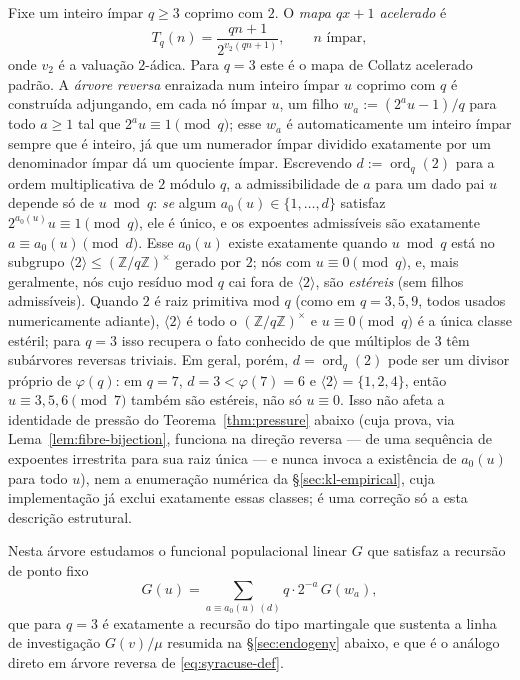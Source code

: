 \documentclass[11pt]{article}
\theoremstyle{definition}
\theoremstyle{remark}
\DeclareMathOperator{\OpOrd}{ord}
\begin{document}
Fixe um inteiro ímpar $q\ge 3$ coprimo com $2$. O \emph{mapa $qx+1$
acelerado} é
\[
  T_q(n) = \frac{qn+1}{2^{v_2(qn+1)}}, \qquad n \text{ ímpar},
\]
onde $v_2$ é a valuação $2$-ádica. Para $q=3$ este é o mapa de Collatz
acelerado padrão. A \emph{árvore reversa} enraizada num inteiro ímpar
$u$ coprimo com $q$ é construída adjungando, em cada nó ímpar $u$, um
filho $w_a := (2^a u - 1)/q$ para todo $a\ge 1$ tal que
$2^a u \equiv 1 \pmod q$; esse $w_a$ é automaticamente um inteiro ímpar
sempre que é inteiro, já que um numerador ímpar dividido exatamente por
um denominador ímpar dá um quociente ímpar. Escrevendo
$d:=\OpOrd_q(2)$ para a ordem multiplicativa de $2$ módulo $q$, a
admissibilidade de $a$ para um dado pai $u$ depende só de $u\bmod q$:
\emph{se} algum $a_0(u)\in\{1,\dots,d\}$ satisfaz
$2^{a_0(u)}u\equiv 1\pmod q$, ele é único, e os expoentes admissíveis
são exatamente $a\equiv a_0(u)\pmod d$. Esse $a_0(u)$ existe exatamente
quando $u\bmod q$ está no subgrupo
$\langle2\rangle\le(\mathbb{Z}/q\mathbb{Z})^\times$ gerado por $2$; nós
com $u\equiv 0\pmod q$, e, mais geralmente, nós cujo resíduo mod $q$
cai fora de $\langle2\rangle$, são \emph{estéreis} (sem filhos
admissíveis). Quando $2$ é raiz primitiva mod $q$ (como em $q=3,5,9$,
todos usados numericamente adiante), $\langle2\rangle$ é todo o
$(\mathbb{Z}/q\mathbb{Z})^\times$ e $u\equiv 0\pmod q$ é a única classe
estéril; para $q=3$ isso recupera o fato conhecido de que múltiplos de
$3$ têm subárvores reversas triviais. Em geral, porém, $d=\OpOrd_q(2)$
pode ser um divisor próprio de $\varphi(q)$: em $q=7$, $d=3<\varphi(7)=6$
e $\langle2\rangle=\{1,2,4\}$, então $u\equiv 3,5,6\pmod7$ também são
estéreis, não só $u\equiv 0$. Isso não afeta a identidade de pressão do
Teorema~\ref{thm:pressure} abaixo (cuja prova, via
Lema~\ref{lem:fibre-bijection}, funciona na direção reversa --- de uma
sequência de expoentes irrestrita para sua raiz única --- e nunca
invoca a existência de $a_0(u)$ para todo $u$), nem a enumeração
numérica da \S\ref{sec:kl-empirical}, cuja implementação já exclui
exatamente essas classes; é uma correção só a esta descrição
estrutural.

Nesta árvore estudamos o funcional populacional linear $G$ que
satisfaz a recursão de ponto fixo
\begin{equation}\label{eq:G-recursion}
  G(u) = \sum_{a \equiv a_0(u) \ (d)} q\cdot 2^{-a}\, G(w_a),
\end{equation}
que para $q=3$ é exatamente a recursão do tipo martingale que sustenta
a linha de investigação $G(v)/\mu$ resumida na \S\ref{sec:endogeny}
abaixo, e que é o análogo direto em árvore reversa de
\eqref{eq:syracuse-def}.
\end{document}
